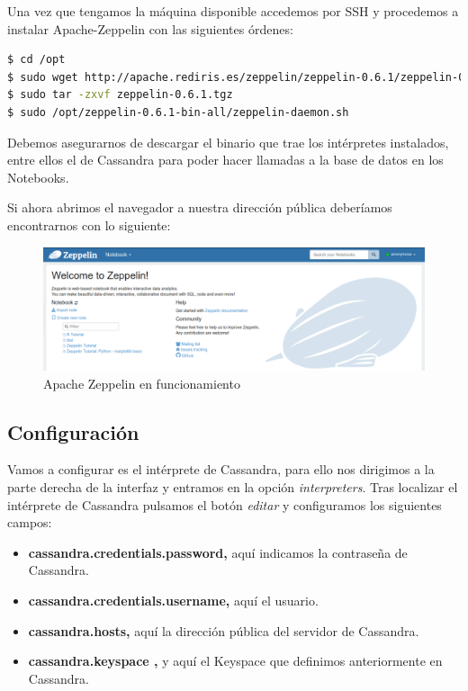 Una vez que tengamos la máquina disponible accedemos por SSH y procedemos a instalar Apache-Zeppelin con las siguientes órdenes:

\begin{lstlisting}[language=bash,caption={Instalación de Apache-Zeppelin},label={lst:pi1}]
$ cd /opt
$ sudo wget http://apache.rediris.es/zeppelin/zeppelin-0.6.1/zeppelin-0.6.1.tgz
$ sudo tar -zxvf zeppelin-0.6.1.tgz
$ sudo /opt/zeppelin-0.6.1-bin-all/zeppelin-daemon.sh
\end{lstlisting}

Debemos asegurarnos de descargar el binario que trae los intérpretes instalados, entre ellos el de Cassandra para poder hacer llamadas a la base de datos en los Notebooks.

Si ahora abrimos el navegador a nuestra dirección pública deberíamos encontrarnos con lo siguiente:

\begin{figure}[!ht]
  \begin{center}
    \includegraphics[scale=0.30]{../images/zeppelin/1.png}
		\caption{Apache Zeppelin en funcionamiento}
    \label{fig:kaa}
	\end{center}
\end{figure}

\subsection{Configuración}

Vamos a configurar es el intérprete de Cassandra, para ello nos dirigimos a la parte derecha de la interfaz y entramos en la opción \textit{interpreters}. Tras localizar el intérprete de Cassandra pulsamos el botón \textit{editar} y configuramos los siguientes campos:

\begin{itemize}
\item \textbf{cassandra.credentials.password, } aquí indicamos la contraseña de Cassandra.
\item \textbf{cassandra.credentials.username, } aquí el usuario.
\item \textbf{cassandra.hosts, } aquí la dirección pública del servidor de Cassandra.
\item \textbf{cassandra.keyspace , } y aquí el Keyspace que definimos anteriormente en Cassandra.
\end{itemize}

